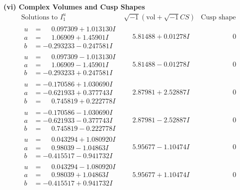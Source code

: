 \documentclass[1p]{elsarticle_modified}
\theoremstyle{definition}
\newcommand{\I}{\sqrt{-1}}
\begin{document}
\newpage\flushleft \textbf{(vi) Complex Volumes and Cusp Shapes}
$$\begin{array}{c|c|c}  
\text{Solutions to }I^u_{1}& \I (\text{vol} + \sqrt{-1}CS) & \text{Cusp shape}\\
 \hline 
\begin{aligned}
u &= \phantom{-}0.097309 + 1.013130 I \\
a &= \phantom{-}1.06909 + 1.45901 I \\
b &= -0.293233 - 0.247581 I\end{aligned}
 & \phantom{-}5.81488 + 0.01278 I & \phantom{-0.000000 } 0 \\ \hline\begin{aligned}
u &= \phantom{-}0.097309 - 1.013130 I \\
a &= \phantom{-}1.06909 - 1.45901 I \\
b &= -0.293233 + 0.247581 I\end{aligned}
 & \phantom{-}5.81488 - 0.01278 I & \phantom{-0.000000 } 0 \\ \hline\begin{aligned}
u &= -0.170586 + 1.030690 I \\
a &= -0.621933 + 0.377743 I \\
b &= \phantom{-}0.745819 + 0.222778 I\end{aligned}
 & \phantom{-}2.87981 + 2.52887 I & \phantom{-0.000000 } 0 \\ \hline\begin{aligned}
u &= -0.170586 - 1.030690 I \\
a &= -0.621933 - 0.377743 I \\
b &= \phantom{-}0.745819 - 0.222778 I\end{aligned}
 & \phantom{-}2.87981 - 2.52887 I & \phantom{-0.000000 } 0 \\ \hline\begin{aligned}
u &= \phantom{-}0.043294 + 1.080920 I \\
a &= \phantom{-}0.98039 - 1.04863 I \\
b &= -0.415517 - 0.941732 I\end{aligned}
 & \phantom{-}5.95677 - 1.10474 I & \phantom{-0.000000 } 0 \\ \hline\begin{aligned}
u &= \phantom{-}0.043294 - 1.080920 I \\
a &= \phantom{-}0.98039 + 1.04863 I \\
b &= -0.415517 + 0.941732 I\end{aligned}
 & \phantom{-}5.95677 + 1.10474 I & \phantom{-0.000000 } 0 \\ \hline\begin{aligned}

\end{aligned}
\end{array}$$
\end{document}
